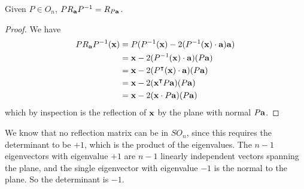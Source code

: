 \begin{lemma}
	Given \(P \in O_n\), \(PR_{\vb a}P^{-1} = R_{P\vb a}\).
\end{lemma}
\begin{proof}
	We have
	\begin{align*}
		PR_{\vb a}P^{-1}(\vb x) & = P(P^{-1}(\vb x) - 2 (P^{-1}(\vb x) \cdot \vb a) \vb a) \\
		                        & = \vb x - 2(P^{-1}(\vb x)\cdot\vb a)(P\vb a)             \\
		                        & = \vb x - 2(P^\intercal (\vb x)\cdot\vb a)(P\vb a)      \\
		                        & = \vb x - 2(\vb x^\intercal P \vb a)(P\vb a)            \\
		                        & = \vb x - 2(\vb x \cdot P\vb a)(P\vb a)
	\end{align*}
	which by inspection is the reflection of \(\vb x\) by the plane with normal \(P\vb a\).
\end{proof}
We know that no reflection matrix can be in \(SO_n\), since this requires the determinant to be \(+1\), which is the product of the eigenvalues.
The \(n-1\) eigenvectors with eigenvalue \(+1\) are \(n-1\) linearly independent vectors spanning the plane, and the single eigenvector with eigenvalue \(-1\) is the normal to the plane.
So the determinant is \(-1\).

